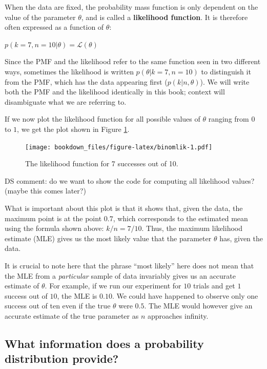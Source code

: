 \documentclass[12pt,]{krantz}
\theoremstyle{definition}
\theoremstyle{definition}
\theoremstyle{definition}
\theoremstyle{remark}
\let\BeginKnitrBlock\begin \let\EndKnitrBlock\end
\begin{document}
When the data are fixed, the probability mass function is only dependent on the value of the parameter \(\theta\), and is called a \textbf{likelihood function}. It is therefore often expressed as a function of \(\theta\):

\(p( k=7, n=10 | \theta) = \mathcal{L}(\theta)\)

Since the PMF and the likelihood refer to the same function seen in two different ways, sometimes the likelihood is written \(p(\theta | k=7, n=10)\) to distinguish it from the PMF, which has the data appearing first (\(p(k|n,\theta)\)). We will write both the PMF and the likelihood identically in this book; context will disambiguate what we are referring to.

If we now plot the likelihood function for all possible values of \(\theta\) ranging from \(0\) to \(1\), we get the plot shown in Figure \ref{fig:binomlik}.

\begin{figure}
\centering
\texttt{[image: bookdown\_files/figure-latex/binomlik-1.pdf]}
\caption{\label{fig:binomlik}The likelihood function for 7 successes out of 10.}
\end{figure}

\BeginKnitrBlock{rmdnote}
DS comment: do we want to show the code for computing all likelihood values? (maybe this comes later?)
\EndKnitrBlock{rmdnote}

What is important about this plot is that it shows that, given the data, the maximum point is at the point \(0.7\), which corresponds to the estimated mean using the formula shown above: \(k/n = 7/10\). Thus, the maximum likelihood estimate (MLE) gives us the most likely value that the parameter \(\theta\) has, given the data.

It is crucial to note here that the phrase ``most likely'' here does not mean that the MLE from a \emph{particular} sample of data invariably gives us an accurate estimate of \(\theta\). For example, if we run our experiment for \(10\) trials and get \(1\) success out of \(10\), the MLE is \(0.10\). We could have happened to observe only one success out of ten even if the true \(\theta\) were \(0.5\). The MLE would however give an accurate estimate of the true parameter as \(n\) approaches infinity.

\hypertarget{what-information-does-a-probability-distribution-provide}{%
\subsection{What information does a probability distribution provide?}\label{what-information-does-a-probability-distribution-provide}}
\end{document}
